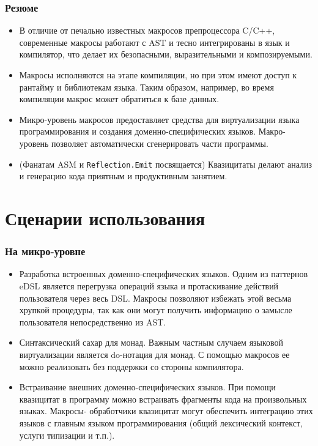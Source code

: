 \documentclass[hyperref={bookmarks=false}]{beamer}
\begin{document}
\begin{frame}[t]
\frametitle{Резюме}
\begin{itemize}
\item В отличие от печально известных макросов препроцессора C/C++, современные макросы работают с AST и тесно интегрированы в язык и компилятор, что делает их безопасными, выразительными и композируемыми.
\item Макросы исполняются на этапе компиляции, но при этом имеют доступ к рантайму и библиотекам языка. Таким образом, например, во время компиляции макрос может обратиться к базе данных.
\item Микро-уровень макросов предоставляет средства для виртуализации языка программирования и создания доменно-специфических языков. Макро-уровень позволяет автоматически сгенерировать части программы.
\item (Фанатам ASM и \texttt{Reflection.Emit} посвящается) Квазицитаты делают анализ и генерацию кода приятным и продуктивным занятием.
\end{itemize}
\end{frame}

\section{Сценарии использования}

\begin{frame}[t]
\frametitle{На микро-уровне}
\begin{itemize}
\item Разработка встроенных доменно-специфических языков. Одним из паттернов eDSL является перегрузка операций языка и протаскивание действий пользователя через весь DSL. Макросы позволяют избежать этой весьма хрупкой процедуры, так как они могут получить информацию о замысле пользователя непосредственно из AST.
\item Синтаксический сахар для монад. Важным частным случаем языковой виртуализации является do-нотация для монад. С помощью макросов ее можно реализовать без поддержки со стороны компилятора.
\item Встраивание внешних доменно-специфических языков. При помощи квазицитат в программу можно встраивать фрагменты кода на произвольных языках. Макросы- обработчики квазицитат могут обеспечить интеграцию этих языков с главным языком программирования (общий лексический контекст, услуги типизации и т.п.).
\end{itemize}
\end{frame}
\end{document}
